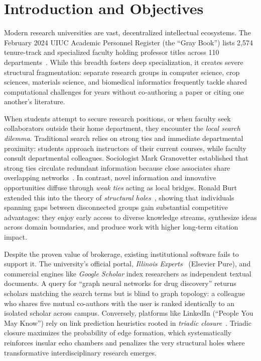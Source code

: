 \section{Introduction and Objectives}

Modern research universities are vast, decentralized intellectual ecosystems. The February 2024 UIUC Academic Personnel Register (the ``Gray Book'') lists 2,574 tenure-track and specialized faculty holding professor titles across 110 departments~\cite{graybook2024}. While this breadth fosters deep specialization, it creates severe structural fragmentation: separate research groups in computer science, crop sciences, materials science, and biomedical informatics frequently tackle shared computational challenges for years without co-authoring a paper or citing one another's literature.

When students attempt to secure research positions, or when faculty seek collaborators outside their home department, they encounter the \emph{local search dilemma}. Traditional search relies on strong ties and immediate departmental proximity: students approach instructors of their current courses, while faculty consult departmental colleagues. Sociologist Mark Granovetter established that strong ties circulate redundant information because close associates share overlapping networks~\cite{granovetter1973}. In contrast, novel information and innovative opportunities diffuse through \emph{weak ties} acting as local bridges. Ronald Burt extended this into the theory of \emph{structural holes}~\cite{burt1992,burt2004}, showing that individuals spanning gaps between disconnected groups gain substantial competitive advantages: they enjoy early access to diverse knowledge streams, synthesize ideas across domain boundaries, and produce work with higher long-term citation impact.

Despite the proven value of brokerage, existing institutional software fails to support it. The university's official portal, \emph{Illinois Experts}~\cite{experts} (Elsevier Pure), and commercial engines like \emph{Google Scholar} index researchers as independent textual documents. A query for ``graph neural networks for drug discovery'' returns scholars matching the search terms but is blind to graph topology: a colleague who shares five mutual co-authors with the user is ranked identically to an isolated scholar across campus. Conversely, platforms like LinkedIn (``People You May Know'') rely on link prediction heuristics rooted in \emph{triadic closure}~\cite{libennowell2007,gupta2013}. Triadic closure maximizes the probability of edge formation, which systematically reinforces insular echo chambers and penalizes the very structural holes where transformative interdisciplinary research emerges.

